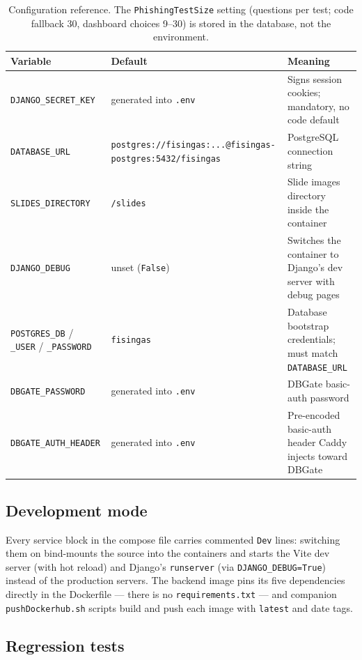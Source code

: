 \documentclass[11pt,a4paper]{article}
\newcommand{\code}[1]{\texttt{#1}}
\begin{document}
\begin{table}[h]
\centering
\small
\begin{tabular}{@{}llp{6.4cm}@{}}
\toprule
\textbf{Variable} & \textbf{Default} & \textbf{Meaning} \\
\midrule
\code{DJANGO\_SECRET\_KEY} & generated into \code{.env} & Signs session cookies; mandatory, no code default \\
\code{DATABASE\_URL}       & \code{postgres://fisingas:...@fisingas-postgres:5432/fisingas} & PostgreSQL connection string \\
\code{SLIDES\_DIRECTORY}   & \code{/slides}   & Slide images directory inside the container \\
\code{DJANGO\_DEBUG}       & unset (\code{False}) & Switches the container to Django's dev server with debug pages \\
\code{POSTGRES\_DB} / \code{\_USER} / \code{\_PASSWORD} & \code{fisingas} & Database bootstrap credentials; must match \code{DATABASE\_URL} \\
\code{DBGATE\_PASSWORD}    & generated into \code{.env} & DBGate basic-auth password \\
\code{DBGATE\_AUTH\_HEADER} & generated into \code{.env} & Pre-encoded basic-auth header Caddy injects toward DBGate \\
\bottomrule
\end{tabular}
\caption{Configuration reference. The \code{PhishingTestSize} setting
(questions per test; code fallback 30, dashboard choices 9--30) is
stored in the database, not the environment.}
\label{tab:config}
\end{table}

\subsection{Development mode}

Every service block in the compose file carries commented \code{Dev}
lines: switching them on bind-mounts the source into the containers
and starts the Vite dev server (with hot reload) and Django's
\code{runserver} (via \code{DJANGO\_DEBUG=True}) instead of the
production servers. The backend image pins its five dependencies
directly in the Dockerfile --- there is no \code{requirements.txt} ---
and companion \code{pushDockerhub.sh} scripts build and push each
image with \code{latest} and date tags.

\subsection{Regression tests}
\end{document}
